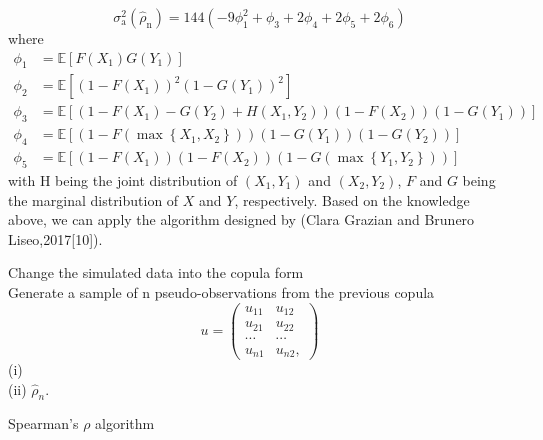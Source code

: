 \documentclass[mstat,12pt]{unswthesis}  %
\numberwithin{equation}{section}
\begin{document}
\begin{equation}
\sigma_{\mathrm{a}}^{2}\left(\hat{\rho}_{\mathrm{n}}\right)=144\left(-9 \phi_{1}^{2}+\phi_{3}+2 \phi_{4}+2 \phi_{5}+2 \phi_{6}\right)
\end{equation}
where
\begin{equation}
\begin{aligned}
\phi_{1} &=\mathbb{E}\left[F\left(X_{1}\right) G\left(Y_{1}\right)\right] \\
\phi_{2} &=\mathbb{E}\left[\left(1-F\left(X_{1}\right)\right)^{2}\left(1-G\left(Y_{1}\right)\right)^{2}\right] \\
\phi_{3} &=\mathbb{E}\left[\left(1-F(X_1)-G(Y_2)+H\left(X_{1}, Y_{2}\right)\right)\left(1-F\left(X_{2}\right)\right)\left(1-G\left(Y_{1}\right)\right)\right] \\
\phi_{4} &=\mathbb{E}\left[\left(1-F\left(\max \left\{X_{1}, X_{2}\right\}\right)\right)\left(1-G\left(Y_{1}\right)\right)\left(1-G\left(Y_{2}\right)\right)\right] \\
\phi_{5} &=\mathbb{E}\left[\left(1-F\left(X_{1}\right)\right)\left(1-F\left(X_{2}\right)\right)\left(1-G\left(\max \left\{Y_{1}, Y_{2}\right\}\right)\right)\right]
\end{aligned}
\end{equation}
with H being the joint distribution of $(X_1,Y_1)$ and $(X_2,Y_2)$, $F$ and $G$ being the marginal distribution of $X$ and $Y$, respectively.
Based on the knowledge above, we can apply the algorithm designed by (Clara Grazian and Brunero Liseo,2017[10]). 
\begin{algorithm}[H]
\SetAlgoLined
 Change the simulated data into the copula form\\
 Generate a sample of n pseudo-observations from the previous copula \\
 \begin{equation}
u=\left(\begin{array}{cc}
u_{11} & u_{12} \\
u_{21} & u_{22} \\
\cdots & \cdots \\
u_{n 1} & u_{n 2},
\end{array}\right)
\end{equation}
 (i)   \\
 (ii)  \Return $\hat{\rho}_n$.
 \caption{Spearman's $\rho$ algorithm}
\end{algorithm} 
\end{document}
